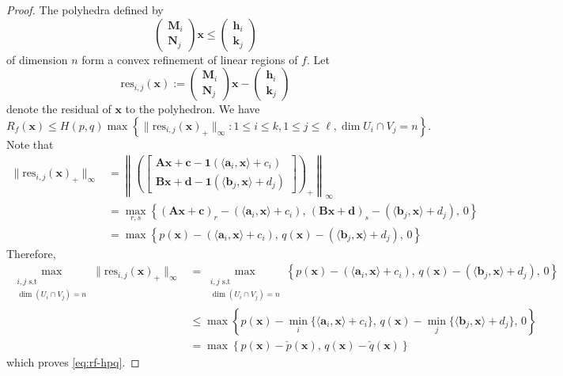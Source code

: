 \documentclass[10pt,a4paper]{amsart}
\def\mA{{\bm{A}}}
\def\mB{{\bm{B}}}
\def\mM{{\bm{M}}}
\def\mN{{\bm{N}}}
\def\va{{\vec{a}}}
\def\vb{{\vec{b}}}
\def\vc{{\bm{c}}}
\def\vd{{\bm{d}}}
\renewcommand{\vec}[1]{\mathbf{#1}}
\def\vh{{\vec{h}}}
\def\vk{{\bm{k}}}
\def\vx{{\vec{x}}}
\begin{document}
\begin{proof}
The polyhedra defined by 
$$
\begin{pmatrix}
            \mM_i \\
            \mN_j
        \end{pmatrix} \vx \le \begin{pmatrix}
            \vh_i \\
            \vk_j
        \end{pmatrix}
$$
of dimension $n$ form a convex refinement of linear regions of $f$. Let 
$$\mathrm{res}_{i,j}(\vx):=\begin{pmatrix}
            \mM_i \\
            \mN_j
        \end{pmatrix} \vx- \begin{pmatrix}
            \vh_i \\
            \vk_j
        \end{pmatrix}
$$        
denote the residual of $\vx$ to the polyhedron. We have 
$$
R_f(\vx)\le H(p,q)\max\left\{\|\mathrm{res}_{i,j}(\vx)_+\|_\infty: 1 \le i \le k, 1 \le j \le \ell, \dim U_i \cap V_j = n \right\}.
$$
Note that
\begin{align*}
    \|\mathrm{res}_{i,j}(\vx)_+\|_\infty
        &= \left\|\left(
            \begin{bmatrix}\mA \vx+\vc-\mathbf{1}(\langle \va_i, \vx \rangle+c_i)\\
                            \mB \vx+\vd-\mathbf{1}(\langle \vb_j, \vx \rangle+d_j)\end{bmatrix}\right)_+\right\|_\infty\\
        &=\max_{r,s}\left\{(\mA \vx+\vc)_r-(\langle \va_i, \vx \rangle+c_i),\,(\mB \vx+\vd)_s-(\langle \vb_j, \vx \rangle+d_j),\, 0\right\}\\
        &=\max\left\{p(\vx)-(\langle \va_i, \vx\rangle+c_i),\, q(\vx)-(\langle \vb_j, \vx\rangle + d_j),\, 0\right\}
\end{align*}
Therefore,
\begin{align*}
    \max_{\substack{i, j \text{ s.t} \\ \dim (U_i \cap V_j) = n}}\|\mathrm{res}_{i,j}(\vx)_+\|_\infty
        &=\max_{\substack{i, j \text{ s.t} \\ \dim (U_i \cap V_j) = n}}\left\{p(\vx)-(\langle \va_i, \vx\rangle +c_i),\, q(\vx)-(\langle \vb_j,  \vx \rangle+d_j),\, 0\right\}\\
        &\le\max\left\{p(\vx)-\min_i\{\langle \va_i, \vx \rangle +c_i\},\, q(\vx)-\min_j\{\langle \vb_j, \vx \rangle +d_j\},\, 0\right\}\\
        &=\max\left\{p(\vx)-\check{p}(\vx),\,q(\vx)-\check{q}(\vx)\right\}
\end{align*}
which proves \eqref{eq:rf-hpq}.
\end{proof}
\end{document}
